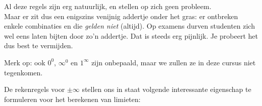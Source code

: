 \documentclass[numbers]{ximera}
\begin{document}
Al deze regels zijn erg natuurlijk, en stellen op zich geen probleem. \\
Maar er zit dus een enigszins venijnig addertje onder het gras: er ontbreken enkele combinaties en die \textit{gelden niet} (altijd). Op examens durven studenten zich wel eens laten bijten door zo'n addertje. Dat is steeds erg pijnlijk. Je probeert het dus best te vermijden.

Merk op: ook $0^0$, $\infty^0$ en $1^\infty$ zijn onbepaald, maar we zullen ze in deze cursus niet tegenkomen.


De rekenregels voor $\pm\infty$ stellen ons in staat volgende interessante eigenschap te formuleren voor het berekenen van limieten:
\end{document}
